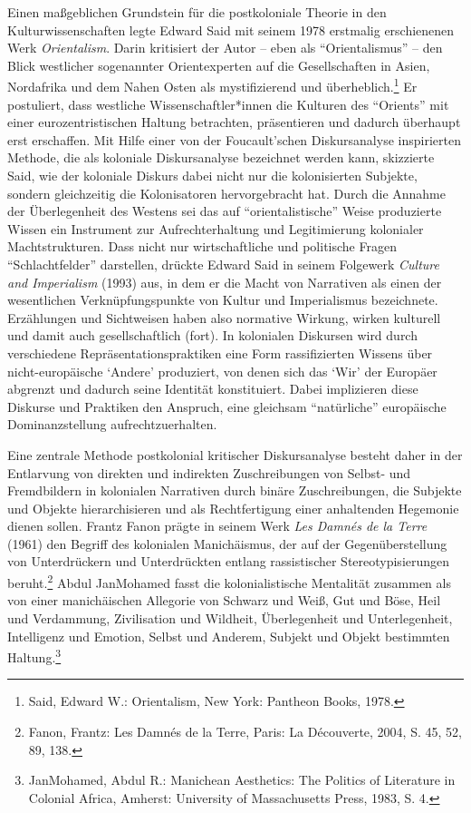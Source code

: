 \documentclass[a4paper,
fontsize=11pt,
oneside,
numbers=noperiodatend,
parskip=half-,
bibliography=totoc,
final
]{scrartcl}
\begin{document}
Einen maßgeblichen Grundstein für die postkoloniale Theorie in den
Kulturwissenschaften legte Edward Said mit seinem 1978 erstmalig
erschienenen Werk \emph{Orientalism}. Darin kritisiert der Autor -- eben
als \enquote{Orientalismus} -- den Blick westlicher sogenannter
Orientexperten auf die Gesellschaften in Asien, Nordafrika und dem Nahen
Osten als mystifizierend und überheblich.\footnote{Said, Edward W.:
  Orientalism, New York: Pantheon Books, 1978.} Er postuliert, dass
westliche Wissenschaftler*innen die Kulturen des \enquote{Orients} mit
einer eurozentristischen Haltung betrachten, präsentieren und dadurch
überhaupt erst erschaffen. Mit Hilfe einer von der Foucault'schen
Diskursanalyse inspirierten Methode, die als koloniale Diskursanalyse
bezeichnet werden kann, skizzierte Said, wie der koloniale Diskurs dabei
nicht nur die kolonisierten Subjekte, sondern gleichzeitig die
Kolonisatoren hervorgebracht hat. Durch die Annahme der Überlegenheit
des Westens sei das auf \enquote{orientalistische} Weise produzierte
Wissen ein Instrument zur Aufrechterhaltung und Legitimierung kolonialer
Machtstrukturen. Dass nicht nur wirtschaftliche und politische Fragen
\enquote{Schlachtfelder} darstellen, drückte Edward Said in seinem
Folgewerk \emph{Culture and Imperialism} (1993) aus, in dem er die Macht
von Narrativen als einen der wesentlichen Verknüpfungspunkte von Kultur
und Imperialismus bezeichnete. Erzählungen und Sichtweisen haben also
normative Wirkung, wirken kulturell und damit auch gesellschaftlich
(fort). In kolonialen Diskursen wird durch verschiedene
Repräsentationspraktiken eine Form rassifizierten Wissens über
nicht-europäische \enquote*{Andere} produziert, von denen sich das
\enquote*{Wir} der Europäer abgrenzt und dadurch seine Identität
konstituiert. Dabei implizieren diese Diskurse und Praktiken den
Anspruch, eine gleichsam \enquote{natürliche} europäische
Dominanzstellung aufrechtzuerhalten.

Eine zentrale Methode postkolonial kritischer Diskursanalyse besteht
daher in der Entlarvung von direkten und indirekten Zuschreibungen von
Selbst- und Fremdbildern in kolonialen Narrativen durch binäre
Zuschreibungen, die Subjekte und Objekte hierarchisieren und als
Rechtfertigung einer anhaltenden Hegemonie dienen sollen. Frantz Fanon
prägte in seinem Werk \emph{Les Damnés de la Terre} (1961) den Begriff
des kolonialen Manichäismus, der auf der Gegenüberstellung von
Unterdrückern und Unterdrückten entlang rassistischer
Stereotypisierungen beruht.\footnote{Fanon, Frantz: Les Damnés de la
  Terre, Paris: La Découverte, 2004, S. 45, 52, 89, 138.} Abdul
JanMohamed fasst die kolonialistische Mentalität zusammen als von einer
manichäischen Allegorie von Schwarz und Weiß, Gut und Böse, Heil und
Verdammung, Zivilisation und Wildheit, Überlegenheit und Unterlegenheit,
Intelligenz und Emotion, Selbst und Anderem, Subjekt und Objekt
bestimmten Haltung.\footnote{JanMohamed, Abdul R.: Manichean Aesthetics:
  The Politics of Literature in Colonial Africa, Amherst: University of
  Massachusetts Press, 1983, S. 4.}
\end{document}
